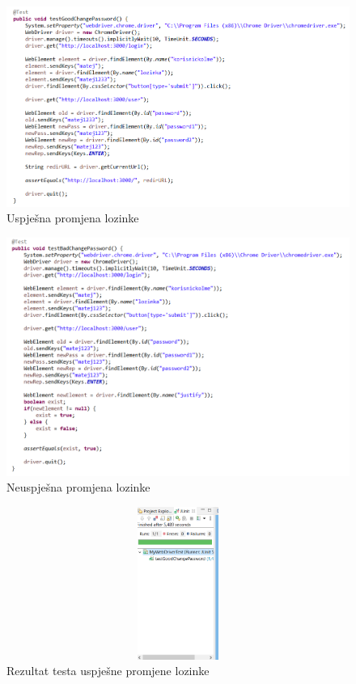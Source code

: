 			\begin{figure}[hp]
                    \centering
                    \includegraphics[width=15cm]{slike/koddobrapromjenalozinke.png}
                    \caption{Uspješna promjena lozinke}
                    \label{fig:useCase-2}
                \end{figure}
			\eject
			
			\begin{figure}[hp]
                    \centering
                    \includegraphics[width=15cm]{slike/kodlosapromjenalozinke.png}
                    \caption{Neuspješna promjena lozinke}
                    \label{fig:useCase-2}
                \end{figure}
			\eject
			
			\begin{figure}[hp]
                    \centering
                    \includegraphics[width=15cm, height=5cm]{slike/passwordgood.png}
                    \caption{Rezultat testa uspješne promjene lozinke}
                    \label{fig:useCase-2}
                \end{figure}
			\eject
			
